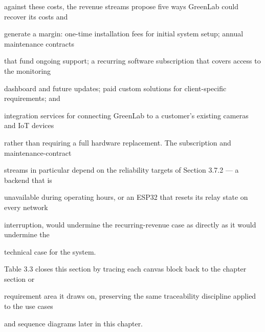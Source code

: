 against these costs, the revenue streams propose five ways GreenLab could recover its costs and

generate a margin: one-time installation fees for initial system setup; annual maintenance contracts

that fund ongoing support; a recurring software subscription that covers access to the monitoring

dashboard and future updates; paid custom solutions for client-specific requirements; and

integration services for connecting GreenLab to a customer's existing cameras and IoT devices

rather than requiring a full hardware replacement. The subscription and maintenance-contract

streams in particular depend on the reliability targets of Section 3.7.2 --- a backend that is

unavailable during operating hours, or an ESP32 that resets its relay state on every network

interruption, would undermine the recurring-revenue case as directly as it would undermine the

technical case for the system.

Table 3.3 closes this section by tracing each canvas block back to the chapter section or

requirement area it draws on, preserving the same traceability discipline applied to the use cases

and sequence diagrams later in this chapter.

